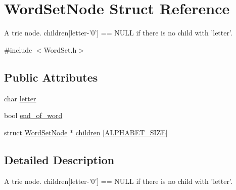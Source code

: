 \hypertarget{structWordSetNode}{\section{Word\-Set\-Node Struct Reference}
\label{structWordSetNode}
}


A trie node. children\mbox{[}letter-\/'0'\mbox{]} == N\-U\-L\-L if there is no child with 'letter'.  




{\ttfamily \#include $<$Word\-Set.\-h$>$}

\subsection*{Public Attributes}
\begin{DoxyCompactItemize}
\item 
char \hyperlink{structWordSetNode_a93d70f00579140db7465e4b5208274ef}{letter}
\item 
bool \hyperlink{structWordSetNode_a53240ee3307a75e6323a7e1eb5c5cd72}{end\-\_\-of\-\_\-word}
\item 
struct \hyperlink{structWordSetNode}{Word\-Set\-Node} $\ast$ \hyperlink{structWordSetNode_a885fe017d3ad9e9caaa36bdc453b8f41}{children} \mbox{[}\hyperlink{WordSet_8h_a6572f1706059832f94025fa12c6c45ed}{A\-L\-P\-H\-A\-B\-E\-T\-\_\-\-S\-I\-Z\-E}\mbox{]}
\end{DoxyCompactItemize}


\subsection{Detailed Description}
A trie node. children\mbox{[}letter-\/'0'\mbox{]} == N\-U\-L\-L if there is no child with 'letter'. 

